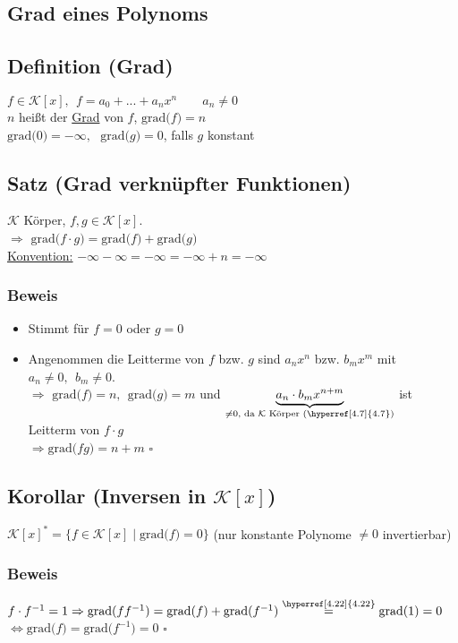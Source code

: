 \documentclass[a4paper, 12pt,titlepage, pdf, headsepline]{article}
\newcommand{\grad}[1]{\textrm{grad(}#1\textrm{)}}
\newcommand{\K}{\mathcal{K}}
\newcommand{\uline}[1]{\underline{#1}}
\newcommand{\qed}{\hfill$\square$}
\renewcommand{\>}{\rightarrow}
\renewcommand{\*}{\cdot}
\begin{document}
		      	\subsection*{Grad eines Polynoms}
		      	\subsection{Definition (Grad)}
		      	$f \in \K[x], ~~f = a_0 + ... + a_nx^n  \qquad a_n \neq 0$\\
		      	$n$ heißt der \uline{Grad} von $f$, $\grad{f}= n$\\
		      	$\grad{0}= -\infty,~~~\grad{g}= 0$, falls $g$ konstant
		      	\subsection{Satz (Grad verknüpfter Funktionen)}
		      	\label{4.22}
		      	$\K$ Körper, $f,g \in \K[x]$.\\
		      	$\Rightarrow$ $\grad{f\*g} = \grad{f}+\grad{g}$ \\
		      	\uline{Konvention:} \qquad$-\infty - \infty = -\infty = -\infty + n = - \infty$
		      	\subsubsection*{Beweis}
		      	\begin{itemize}
		      		\item Stimmt für $f = 0 $ oder $g = 0$
		      		\item Angenommen die Leitterme von $f$ bzw. $g$ sind $a_nx^n$ bzw. $b_mx^m$ mit\\ $a_n \neq 0,~~ b_m \neq 0$.\\
		      		      $\Rightarrow$ $\grad{f} = n,~~\grad{g} = m$ und $\underbrace{a_n \cdot b_m x^{n+m}}_{\neq0\textrm{, da }\K\textrm{ Körper (\hyperref[4.7]{4.7})}}$ ist Leitterm von $f \cdot g $\\$
		      		      \Rightarrow \grad{fg} = n+m$ \qed
		      	\end{itemize}
		      	\subsection{Korollar (Inversen in $\K[x]$)}
		      	$\K[x]^* = \{f \in \K[x]\mid\grad{f}= 0 \}$ (nur konstante Polynome $\neq 0$ invertierbar)
		      	\subsubsection*{Beweis}
		      	$f \cdot f^{-1} = 1 \Rightarrow\grad{ff^{-1}}=\grad{f}+\grad{f^{-1}}\overset{\textrm{\hyperref[4.22]{4.22}}}{=}\grad{1}=0$\\
		      	\noindent\hspace*{19mm}$\Leftrightarrow\grad{f}=\grad{f^{-1}}=0$ \qed
\end{document}
